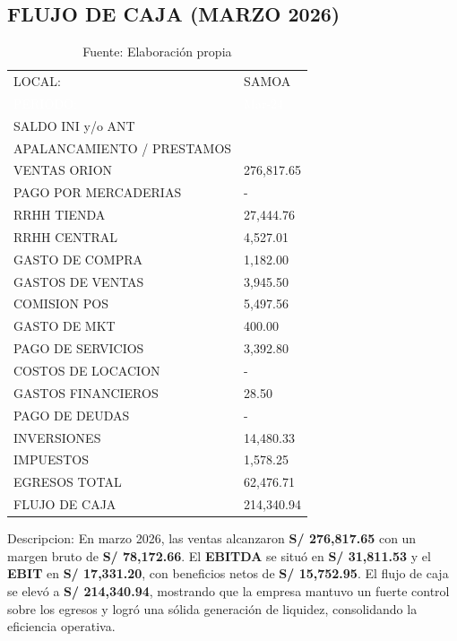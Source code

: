 \subsection*{FLUJO DE CAJA (MARZO 2026)}
\begin{table}[H]
\centering
\begin{tabular}{|L{8cm}|R{4cm}|}
\hline
{} LOCAL: &  SAMOA \\
\textcolor{white}{PERIODO:} & \textcolor{white}{Mar-24} \\ \hline
SALDO INI y/o ANT & \\ 
APALANCAMIENTO / PRESTAMOS & \\ 
 VENTAS ORION & 276,817.65 \\ 
PAGO POR MERCADERIAS & - \\ 
RRHH TIENDA & 27,444.76 \\ 
RRHH CENTRAL & 4,527.01 \\ 
GASTO DE COMPRA & 1,182.00 \\ 
GASTOS DE VENTAS & 3,945.50 \\ 
COMISION POS & 5,497.56 \\ 
GASTO DE MKT & 400.00 \\ 
PAGO DE SERVICIOS & 3,392.80 \\ 
COSTOS DE LOCACION & - \\ 
GASTOS FINANCIEROS & 28.50 \\ 
PAGO DE DEUDAS & - \\ 
INVERSIONES & 14,480.33 \\ 
IMPUESTOS & 1,578.25 \\ 
 EGRESOS TOTAL & 62,476.71 \\ 
 FLUJO DE CAJA & 214,340.94 \\ \hline
\end{tabular}
\caption{Fuente: Elaboración propia}
\end{table}

Descripcion:
En marzo 2026, las ventas alcanzaron \textbf{S/ 276,817.65} con un margen bruto de \textbf{S/ 78,172.66}. El \textbf{EBITDA} se situó en \textbf{S/ 31,811.53} y el \textbf{EBIT} en \textbf{S/ 17,331.20}, con beneficios netos de \textbf{S/ 15,752.95}. El flujo de caja se elevó a \textbf{S/ 214,340.94}, mostrando que la empresa mantuvo un fuerte control sobre los egresos y logró una sólida generación de liquidez, consolidando la eficiencia operativa.

